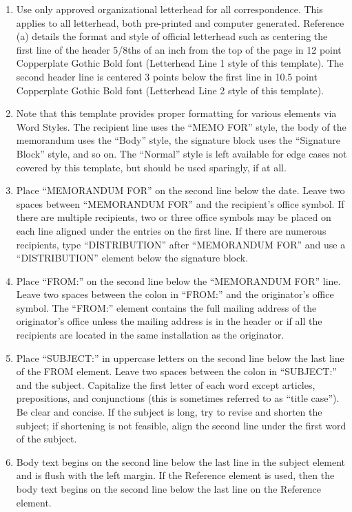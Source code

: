 \documentclass[12pt]{article}
\begin{document}
\begin{RaggedRight}
\begin{enumerate}
    \item Use only approved organizational letterhead for all correspondence. This applies to all letterhead, both pre-printed and computer generated. Reference (a) details the format and style of official letterhead such as centering the first line of the header 5/8ths of an inch from the top of the page in 12 point Copperplate Gothic Bold font (Letterhead Line 1 style of this template). The second header line is centered 3 points below the first line in 10.5 point Copperplate Gothic Bold font (Letterhead Line 2 style of this template).
    \item Note that this template provides proper formatting for various elements via Word Styles. The recipient line uses the “MEMO FOR” style, the body of the memorandum uses the “Body” style, the signature block uses the “Signature Block” style, and so on. The “Normal” style is left available for edge cases not covered by this template, but should be used sparingly, if at all.
    \item Place “MEMORANDUM FOR” on the second line below the date. Leave two spaces between “MEMORANDUM FOR” and the recipient’s office symbol. If there are multiple recipients, two or three office symbols may be placed on each line aligned under the entries on the first line. If there are numerous recipients, type “DISTRIBUTION” after “MEMORANDUM FOR” and use a “DISTRIBUTION” element below the signature block.
    \item Place “FROM:” on the second line below the “MEMORANDUM FOR” line. Leave two spaces between the colon in “FROM:” and the originator’s office symbol. The “FROM:” element contains the full mailing address of the originator’s office unless the mailing address is in the header or if all the recipients are located in the same installation as the originator.
    \item Place “SUBJECT:” in uppercase letters on the second line below the last line of the FROM element. Leave two spaces between the colon in “SUBJECT:” and the subject. Capitalize the first letter of each word except articles, prepositions, and conjunctions (this is sometimes referred to as “title case”). Be clear and concise. If the subject is long, try to revise and shorten the subject; if shortening is not feasible, align the second line under the first word of the subject.
    \item Body text begins on the second line below the last line in the subject element and is flush with the left margin. If the Reference element is used, then the body text begins on the second line below the last line on the Reference element.

\end{enumerate}
\end{RaggedRight}
\end{document}
